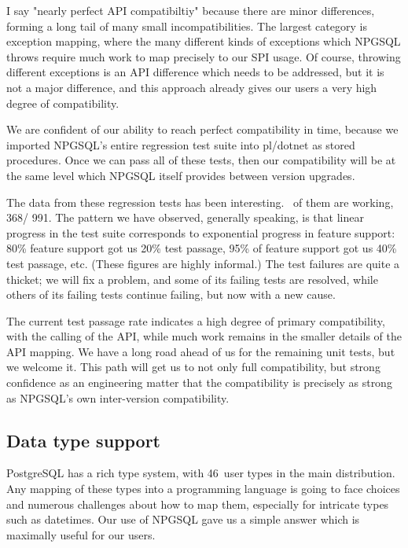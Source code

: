 \documentclass[sigconf,techreport,authorversion,nonacm]{acmart}
\newcommand{\psqltypecount}{46}
\newcommand{\npgsqlcount}{991}
\newcommand{\npgsqlpassing}{368}
\begin{document}
I say "nearly perfect API compatibiltiy" because there are minor
differences, forming a long tail of many small incompatibilities.  The
largest category is exception mapping, where the many different kinds of
exceptions which NPGSQL throws require much work to map precisely to our
SPI usage.  Of course, throwing different exceptions is an API difference
which needs to be addressed, but it is not a major difference, and this
approach already gives our users a very high degree of compatibility.

We are confident of our ability to reach perfect compatibility
in time, because we imported NPGSQL's entire regression test
suite into pl/dotnet as stored procedures.  Once we can pass
all of these tests, then our compatibility will be at the same
level which NPGSQL itself provides between version upgrades.

The data from these regression tests has been interesting.
\npgsqlpercentage\, of them are working, \npgsqlpassing / \npgsqlcount.
The pattern we have observed, generally speaking, is that linear progress
in the test suite corresponds to exponential progress in feature support:
80\% feature support got us 20\% test passage, 95\% of feature support
got us 40\% test passage, etc.  (These figures are highly informal.)
The test failures are quite a thicket; we will fix a problem, and some
of its failing tests are resolved, while others of its failing tests
continue failing, but now with a new cause.

The current test passage rate indicates a high degree of primary
compatibility, with the calling of the API, while much work remains in
the smaller details of the API mapping.  We have a long road ahead of us
for the remaining unit tests, but we welcome it.  This path will get us
to not only full compatibility, but strong confidence as an engineering
matter that the compatibility is precisely as strong as NPGSQL's own
inter-version compatibility.

\subsection{Data type support}

PostgreSQL has a rich type system, with \psqltypecount\ user types in
the main distribution. Any mapping of these types into a programming
language is going to face choices and numerous challenges about how to
map them, especially for intricate types such as datetimes.  Our use of
NPGSQL gave us a simple answer which is maximally useful for our users.
\end{document}
